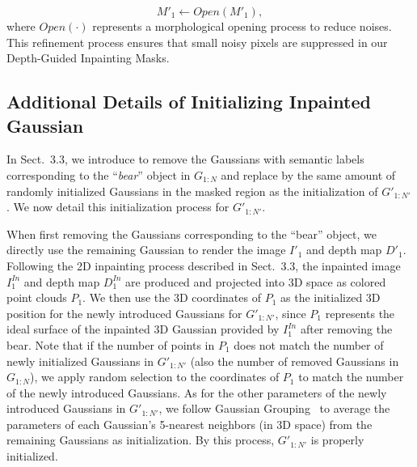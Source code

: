 \begin{equation}
    M'_1 \leftarrow Open(M'_1), 
\end{equation}
where $Open(\cdot)$ represents a morphological opening process to reduce noises. This refinement process ensures that small noisy pixels are suppressed in our Depth-Guided Inpainting Masks.

\subsection{Additional Details of  Initializing Inpainted Gaussian}
In Sect.~\textcolor{cvprblue}{3.3}, we introduce to remove the Gaussians with semantic labels corresponding to the ``\textit{bear}'' object in $G_{1:N}$ and replace by the same amount of randomly initialized Gaussians in the masked region as the initialization of $G'_{1:N'}$. We now detail this initialization process for $G'_{1:N'}$. 

When first removing the Gaussians corresponding to the ``bear'' object, we directly use the remaining Gaussian to render the image $I'_1$ and depth map $D'_1$. Following the 2D inpainting process described in Sect.~\textcolor{cvprblue}{3.3}, the inpainted image $I^{In}_1$ and depth map $D^{In}_1$ are produced and projected into 3D space as colored point clouds $P_1$. We then use the 3D coordinates of $P_1$ as the initialized 3D position for the newly introduced Gaussians for $G'_{1:N'}$, since $P_1$ represents the ideal surface of the inpainted 3D Gaussian provided by $I^{In}_1$ after removing the bear. Note that if the number of points in $P_1$ does not match the number of newly initialized Gaussians in $G'_{1:N'}$ (also the number of removed Gaussians in $G_{1:N}$), we apply random selection to the coordinates of $P_1$ to match the number of the newly introduced Gaussians. As for the other parameters of the newly introduced Gaussians in $G'_{1:N'}$, we follow Gaussian Grouping~\cite{ye2023gaussiangrouping} to average the parameters of each Gaussian's 5-nearest neighbors (in 3D space) from the remaining Gaussians as initialization. By this process, $G'_{1:N'}$ is properly initialized.



